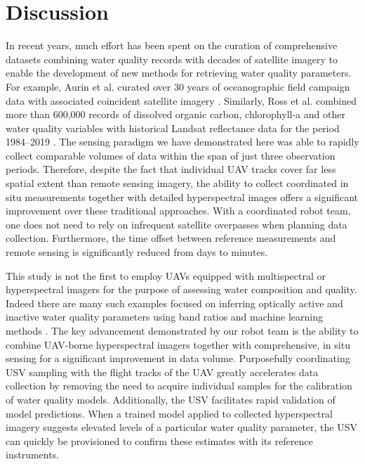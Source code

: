 \documentclass[remotesensing,article,accept,pdftex,moreauthors]{Definitions/mdpi}
\begin{document}
\section{Discussion} \label{sec:discussion}

In recent years, much effort has been spent on the curation of comprehensive datasets combining water quality records with decades of satellite imagery to enable the development of new methods for retrieving water quality parameters. For example, Aurin et al. curated over 30 years of oceanographic field campaign data with associated coincident satellite imagery \cite{aurin2018remote}. Similarly, Ross et al. combined more than 600,000 records of dissolved organic carbon, chlorophyll-a and other water quality variables with historical Landsat reflectance data for the period 1984--2019 \cite{ross2019aquasat}. The sensing paradigm we have demonstrated here was able to rapidly collect comparable volumes of data within the span of just three observation periods. Therefore, despite the fact that individual UAV tracks cover far less spatial extent than remote sensing imagery, the ability to collect coordinated in situ measurements together with detailed hyperspectral images offers a significant improvement over these traditional approaches. With a coordinated robot team, one does not need to rely on infrequent satellite overpasses when planning data collection. Furthermore, the time offset between reference measurements and remote sensing is significantly reduced from days to minutes.

This study is not the first to employ UAVs equipped with multispectral or hyperspectral imagers for the purpose of assessing water composition and quality. Indeed there are many such examples focused on inferring optically active and inactive water quality parameters using band ratios and machine learning methods \cite{vogt2016near,lu2021retrieval, zhang2022selection}. The key advancement demonstrated by our robot team is the ability to combine UAV-borne hyperspectral imagers together with comprehensive, in situ sensing for a significant improvement in data volume. Purposefully coordinating USV sampling with the flight tracks of the UAV greatly accelerates data collection by removing the need to acquire individual samples for the calibration of water quality models. Additionally, the USV facilitates rapid validation of model predictions. When a trained model applied to collected hyperspectral imagery suggests elevated levels of a particular water quality parameter, the USV can quickly be provisioned to confirm these estimates with its reference instruments. 
\end{document}
